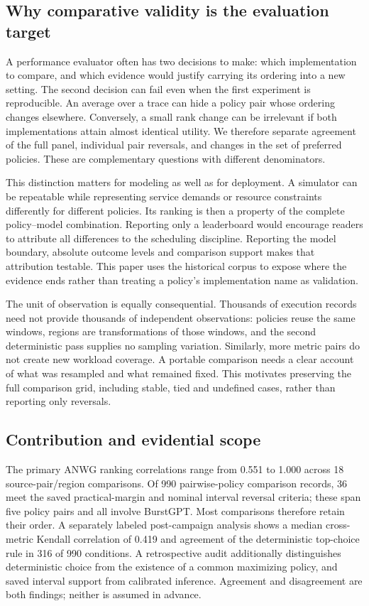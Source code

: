 \subsection{Why comparative validity is the evaluation target}
A performance evaluator often has two decisions to make: which
implementation to compare, and which evidence would justify carrying its
ordering into a new setting. The second decision can fail even when the
first experiment is reproducible. An average over a trace can hide a
policy pair whose ordering changes elsewhere. Conversely, a small rank
change can be irrelevant if both implementations attain almost identical
utility. We therefore separate agreement of the full panel, individual
pair reversals, and changes in the set of preferred policies. These are
complementary questions with different denominators.

This distinction matters for modeling as well as for deployment. A
simulator can be repeatable while representing service demands or resource
constraints differently for different policies. Its ranking is then a
property of the complete policy--model combination. Reporting only a
leaderboard would encourage readers to attribute all differences to the
scheduling discipline. Reporting the model boundary, absolute outcome
levels and comparison support makes that attribution testable. This paper
uses the historical corpus to expose where the evidence ends rather than
treating a policy's implementation name as validation.

The unit of observation is equally consequential. Thousands of execution
records need not provide thousands of independent observations: policies
reuse the same windows, regions are transformations of those windows, and
the second deterministic pass supplies no sampling variation. Similarly,
more metric pairs do not create new workload coverage. A portable
comparison needs a clear account of what was resampled and what remained
fixed. This motivates preserving the full comparison grid, including
stable, tied and undefined cases, rather than reporting only reversals.

\subsection{Contribution and evidential scope}
The primary ANWG ranking correlations range from 0.551 to 1.000 across 18
source-pair/region comparisons. Of 990 pairwise-policy comparison records,
36 meet the saved practical-margin and nominal interval reversal criteria;
these span five policy pairs and all involve BurstGPT. Most comparisons
therefore retain their order. A separately labeled post-campaign analysis
shows a median cross-metric Kendall correlation of 0.419 and agreement of
the deterministic top-choice rule in 316 of 990 conditions. A retrospective audit additionally distinguishes deterministic choice
from the existence of a common maximizing policy, and saved interval
support from calibrated inference. Agreement and disagreement are both
findings; neither is assumed in advance.

